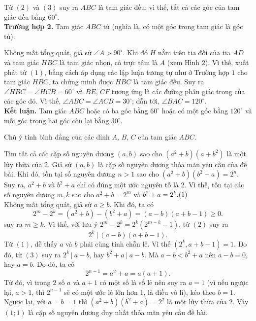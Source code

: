 \begin{bt}
{Từ $(2)$ và $(3)$ suy ra $ABC$ là tam giác đều; vì thế, tất cả các góc của tam giác đều bằng $60^\circ$.\\
{\bf Trường hợp 2.} Tam giác $ABC$ tù (nghĩa là, có một góc trong tam giác là góc tù).
\begin{center}
\end{center}
Không mất tổng quát, giả sử $\angle{A}>90^\circ$. Khi đó $H$ nằm trên tia đối của tia $AD$ và tam giác $HBC$ là tam giác nhọn, có trực tâm là $A$ (xem Hình $2$). Vì thế, xuất phát từ $(1)$, bằng cách áp dụng các lập luận tương tự như ở Trường hợp $1$ cho tam giác $HBC$, ta chứng minh được $HBC$ là tam giác đều.
Suy ra $\angle{HBC}=\angle{HCB}=60^\circ$ và $BE$, $CF$ tương ứng là các đường phân giác trong của các góc đó. Vì thế, $\angle{ABC}=\angle{ACB}=30^\circ$; dẫn tới, $\angle{BAC}=120^\circ$.\\
{\bf Kết luận.} Tam giác $ABC$ hoặc có ba góc bằng $60^\circ$ hoặc có một góc bằng $120^\circ$ và mỗi góc trong hai góc còn lại bằng $30^\circ$.
\begin{nx}
Chú ý tính bình đẳng của các đỉnh $A$, $B$, $C$ của tam giác $ABC$.
\end{nx}
}
\end{bt}
\begin{bt}%
Tìm tất cả các cặp số nguyên dương $(a,b)$ sao cho $(a^2+b)(a+b^2)$ là một lũy thừa của $2$.
\loigiai
{
Giả sử $(a,b)$ là cặp số nguyên dương thỏa mãn yêu cầu của đề bài. Khi đó, tồn tại số nguyên dương $n>1$ sao cho $(a^2+b)(b^2+a) =2^n.$ Suy ra, $a^2+b$ và $b^2+a$ chỉ có đúng một ước nguyên tố là $2$. Vì thế, tồn tại các số nguyên dương $m,k$ sao cho $a^2+b=2^m$  và $b^2+a=2^k. \hfill (1)$  \\
Không mất tổng quát, giả sử $a \geq b$. Khi đó, ta có 
\[2^m-2^k=(a^2+b)-(b^2+a) = (a-b)(a+b-1) \geq 0.\tag{2}\] 
suy ra $m \geq k$. Vì thế, với lưu ý $2^m-2^k =2^k(2^{m-k}-1)$, từ $(2)$ suy ra \[2^k~ | ~ (a-b)(a+b-1).\tag{3}\]
Từ $(1)$, dễ thấy $a$ và $b$ phải cùng tính chẵn lẻ. Vì thế $(2^k,a+b-1)=1$. Do đó, từ $(3)$ suy ra $2^k ~|~a-b$, hay $b^2+a ~|~ a-b$. Mà $a-b <b^2+a$ nên $a-b=0$, hay $a=b$. Do đó, ta có 
$$2^{n-1}=a^2+a=a(a+1).$$
Từ đó, vì trong $2$ số $a$ và $a+1$ có một số là số lẻ nên suy ra $a=1$ (vì nếu ngược lại, $a>1$, thì $2^{n-1}$ sẽ có một ước lẻ lớn hơn $1$, là điều vô lí), kéo theo $b=1$. Ngược lại, với $a=b=1$ thì $(a^2+b)(b^2+a)=2^2$ là một lũy thừa của $2$. 
Vậy $(1;1)$ là cặp số nguyên dương duy nhất thỏa mãn yêu cầu đề bài.
}
\end{bt}
